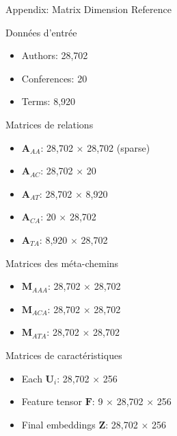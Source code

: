 \documentclass[9pt,aspectratio=169,professionalfonts]{beamer}
\begin{document}
\appendix

\begin{frame}{Appendix: Matrix Dimension Reference}
\begin{block}{Données d'entrée}
\begin{itemize}
    \item Authors: 28,702
    \item Conferences: 20  
    \item Terms: 8,920
\end{itemize}
\end{block}

\begin{block}{Matrices de relations}
\begin{itemize}
    \item $\mathbf{A}_{AA}$: 28,702 $\times$ 28,702 (sparse)
    \item $\mathbf{A}_{AC}$: 28,702 $\times$ 20
    \item $\mathbf{A}_{AT}$: 28,702 $\times$ 8,920
    \item $\mathbf{A}_{CA}$: 20 $\times$ 28,702
    \item $\mathbf{A}_{TA}$: 8,920 $\times$ 28,702
\end{itemize}
\end{block}

\begin{block}{Matrices des méta-chemins}
\begin{itemize}
    \item $\mathbf{M}_{AAA}$: 28,702 $\times$ 28,702
    \item $\mathbf{M}_{ACA}$: 28,702 $\times$ 28,702  
    \item $\mathbf{M}_{ATA}$: 28,702 $\times$ 28,702
\end{itemize}
\end{block}

\begin{block}{Matrices de caractéristiques}
\begin{itemize}
    \item Each $\mathbf{U}_i$: 28,702 $\times$ 256
    \item Feature tensor $\mathbf{F}$: 9 $\times$ 28,702 $\times$ 256
    \item Final embeddings $\mathbf{Z}$: 28,702 $\times$ 256
\end{itemize}
\end{block}
\end{frame}
\end{document}
